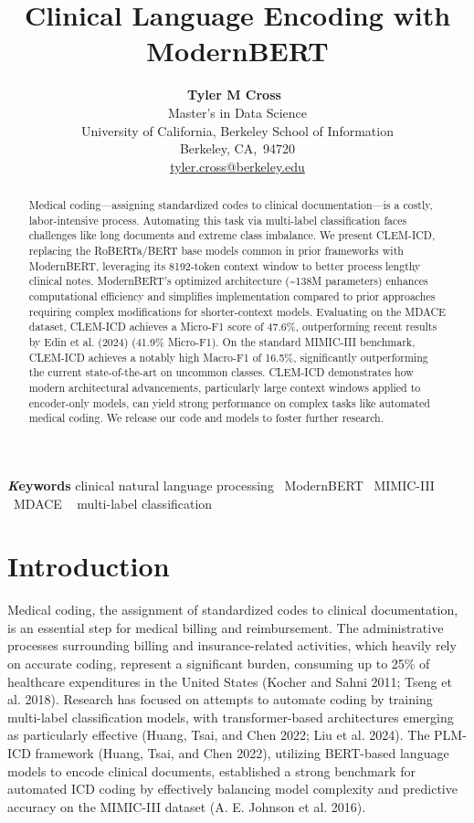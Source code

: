 \documentclass[
]{article}
\title{Clinical Language Encoding with ModernBERT}
\author{\textbf{Tyler M Cross}~\orcidlink{0009-0003-3529-8222}\\Master's
in Data Science\\University of California, Berkeley School of
Information\\Berkeley,
CA,\ 94720\\\href{mailto:tyler.cross@berkeley.edu}{tyler.cross@berkeley.edu}}
\date{}
\begin{document}
\maketitle
\begin{abstract}
Medical coding---assigning standardized codes to clinical
documentation---is a costly, labor-intensive process. Automating this
task via multi-label classification faces challenges like long documents
and extreme class imbalance. We present CLEM-ICD, replacing the
RoBERTa/BERT base models common in prior frameworks with ModernBERT,
leveraging its 8192-token context window to better process lengthy
clinical notes. ModernBERT's optimized architecture (\textasciitilde138M
parameters) enhances computational efficiency and simplifies
implementation compared to prior approaches requiring complex
modifications for shorter-context models. Evaluating on the MDACE
dataset, CLEM-ICD achieves a Micro-F1 score of 47.6\%, outperforming
recent results by Edin et al. (2024) (41.9\% Micro-F1). On the standard
MIMIC-III benchmark, CLEM-ICD achieves a notably high Macro-F1 of
16.5\%, significantly outperforming the current state-of-the-art on
uncommon classes. CLEM-ICD demonstrates how modern architectural
advancements, particularly large context windows applied to encoder-only
models, can yield strong performance on complex tasks like automated
medical coding. We release our code and models to foster further
research.
\end{abstract}
{\bfseries \emph Keywords}
\def\sep{\textbullet\ }
clinical natural language
processing \sep ModernBERT \sep MIMIC-III \sep MDACE \sep 
multi-label classification



\section{Introduction}\label{sec-intro}

Medical coding, the assignment of standardized codes to clinical
documentation, is an essential step for medical billing and
reimbursement. The administrative processes surrounding billing and
insurance-related activities, which heavily rely on accurate coding,
represent a significant burden, consuming up to 25\% of healthcare
expenditures in the United States (Kocher and Sahni 2011; Tseng et al.
2018). Research has focused on attempts to automate coding by training
multi-label classification models, with transformer-based architectures
emerging as particularly effective (Huang, Tsai, and Chen 2022; Liu et
al. 2024). The PLM-ICD framework (Huang, Tsai, and Chen 2022), utilizing
BERT-based language models to encode clinical documents, established a
strong benchmark for automated ICD coding by effectively balancing model
complexity and predictive accuracy on the MIMIC-III dataset (A. E.
Johnson et al. 2016).
\end{document}
